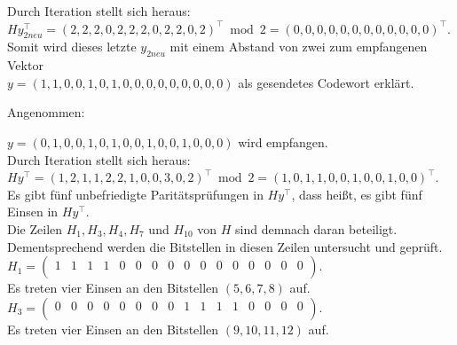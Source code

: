 \begin{Beispiel}
        Durch Iteration stellt sich heraus:\\
        $Hy_{2neu}^\intercal=  (2,2,2,0,2,2,2,0,2,2,0,2)^\intercal \bmod 2= (0,0,0,0,0,0,0,0,0,0,0,0)^\intercal.$\\
         
        Somit wird dieses letzte $y_{2neu}$ mit einem Abstand von zwei 
        zum empfangenen Vektor\\
        $y = (1,1,0,0,1,0,1,0,0,0,0,0,0,0,0,0)$ als gesendetes Codewort erklärt.\\
        
    \end{Beispiel}
    
    \begin{Beispiel}
        Angenommen:
    
        $y = (0,1,0,0,1,0,1,0,0,1,0,0,1,0,0,0)$ wird empfangen.\\
        
        Durch Iteration stellt sich heraus:\\
        $Hy^\intercal= (1,2,1,1,2,2,1,0,0,3,0,2)^\intercal \bmod 2= (1,0,1,1,0,0,1,0,0,1,0,0)^\intercal.$\\
        
        Es gibt fünf unbefriedigte Paritätsprüfungen in $Hy^\intercal$, dass hei\ss{}t, es gibt fünf Einsen in $Hy^\intercal.$\\
        Die Zeilen $H_1, H_3, H_4, H_7$ und $H_{10}$ von $H$ sind demnach daran beteiligt.\\ 
        Dementsprechend werden die Bitstellen in diesen Zeilen untersucht und geprüft.\\
        
        $H_1= \left( \begin{array}{rrrrrrrrrrrrrrrr}
            1 & 1 & 1 & 1 & 0 & 0 & 0 & 0 & 0 & 0 & 0 & 0 & 0 & 0 & 0 & 0 \\
           \end{array}\right). 
        $\\
        Es treten vier Einsen an den Bitstellen $(5, 6, 7, 8)$ auf.\\
        
        $H_3= \left( \begin{array}{rrrrrrrrrrrrrrrr}
            0 & 0 & 0 & 0 & 0 & 0 & 0 & 0 & 1 & 1 & 1 & 1 & 0 & 0 & 0 & 0 \\
           \end{array}\right). 
        $\\
        Es treten vier Einsen an den Bitstellen $(9, 10, 11, 12)$ auf.\\
        

\end{Beispiel}
